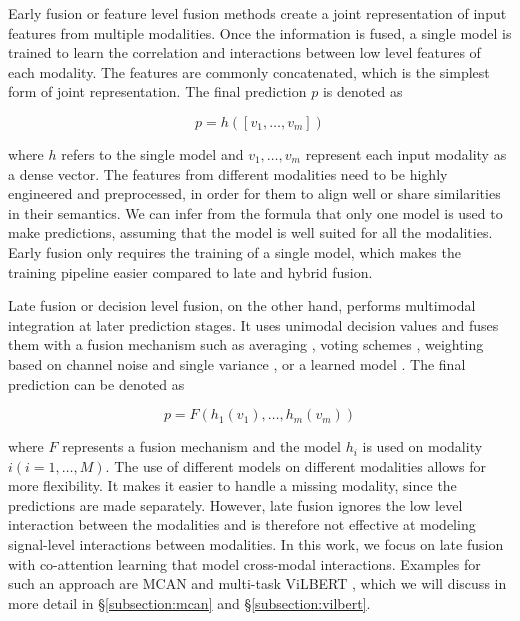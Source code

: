 \documentclass{article}
\begin{document}
Early fusion or feature level fusion methods create a joint representation of input features from multiple modalities. Once the information is fused, a single model is trained to learn the correlation and interactions between low level features of each modality. The features are commonly concatenated, which is the simplest form of joint representation. The final prediction $p$ is denoted as

\begin{equation}
p = h([v_1, \dots , v_m])
\end{equation}

where $h$ refers to the single model and $ v_1, \dots , v_m$ represent each input modality as a dense vector. The features from different modalities need to be highly engineered and preprocessed, in order for them to align well or share similarities in their semantics. We can infer from the formula that only one model is used to make predictions, assuming that the model is well suited for all the modalities. Early fusion only requires the training of a single model, which makes the training pipeline easier compared to late and hybrid fusion.

Late fusion or decision level fusion, on the other hand, performs multimodal integration at later prediction stages. It uses unimodal decision values and fuses them with a fusion mechanism such as averaging \citep{shutova2016black}, voting schemes \citep{morvant2014vote}, weighting based on channel noise \citep{potamianos2003noise} and single variance \citep{evangelopoulos2013variance}, or a learned model \citep{glodek2011learned, ramirez2011learned}. The final prediction can be denoted as

\begin{equation}
p = F(h_1(v_1), \dots , h_m(v_m))
\end{equation}

where $F$ represents a fusion mechanism and the model $h_i$ is used on modality $ i (i = 1, \dots , M)$. The use of different models on different modalities allows for more flexibility. It makes it easier to handle a missing modality, since the predictions are made separately. However, late fusion ignores the low level interaction between the modalities and is therefore not effective at modeling signal-level interactions between modalities. In this work, we focus on late fusion with co-attention learning that model cross-modal interactions. Examples for such an approach are MCAN \citep{yu2019mcan} and multi-task ViLBERT \citep{lu2020multitask}, which we will discuss in more detail in \S \ref{subsection:mcan} and \S \ref{subsection:vilbert}.
\end{document}
